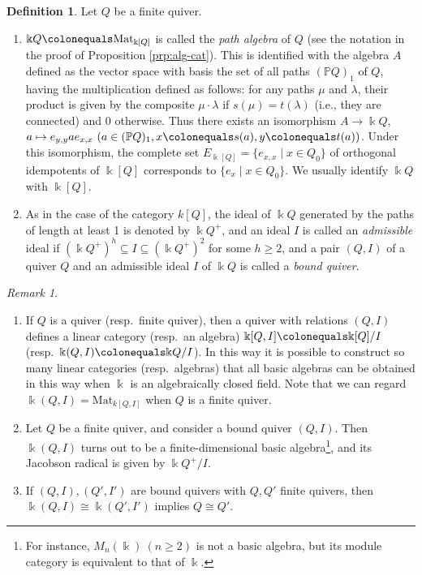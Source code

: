 \documentclass{surv-l}
\numberwithin{equation}{chapter}
\numberwithin{figure}{chapter}
\theoremstyle{plain}
\theoremstyle{definition}
\newtheorem{dfn}[thm]{Definition}
\theoremstyle{remark}
\newtheorem{rmk}[thm]{Remark}
\begin{document}
\begin{dfn}
Let $Q$ be a finite quiver.
\begin{enumerate}
\item
$\Bbbk Q\colonequals  \mathrm{Mat}_{\Bbbk[Q]}$ is called the \emph{path algebra} of $Q$
(see the notation in the proof of Proposition \ref{prp:alg-cat}).
This is identified with the algebra $A$ defined as the vector space
with basis the set of all paths $(\mathbb{P} Q)_1$ of $Q$, having the
multiplication defined as follows:
for any paths $\mu$ and $\lambda$, their product is given by
the composite $\mu\cdot\lambda$ if $s(\mu)=t(\lambda)$ (i.e., they are connected)
and 0 otherwise.
Thus there exists an isomorphism
$A \to \Bbbk Q$,\ $a \mapsto e_{y,y}ae_{x,x}\ (a \in (\mathbb{P} Q)_1, x\colonequals s(a), y\colonequals t(a))$.
Under this isomorphism, the complete set $E_{\Bbbk[Q]} = \{e_{x,x} \mid x \in Q_0\}$
of orthogonal idempotents of $\Bbbk[Q]$ corresponds to
$\{e_x \mid x \in Q_0\}$.
We usually identify $\Bbbk Q$ with $\Bbbk[Q]$.
\item
As in the case of the category $k[Q]$, the ideal of $\Bbbk Q$ generated by
the paths of length at least 1 is denoted by $\Bbbk Q^{+}$, and an ideal
$I$ is called an \emph{admissible} ideal if
$(\Bbbk Q^+)^{h} \subseteq I \subseteq (\Bbbk Q^+)^{2}$
for some $h \ge 2$, and a pair
$(Q,I)$ of a quiver $Q$ and an admissible ideal $I$ of $\Bbbk Q$
is called a \emph{bound quiver}.
\end{enumerate}
\end{dfn}

\begin{rmk}\leavevmode
\label{rmk:bound-qvr}\begin{enumerate}
\item If $Q$ is a quiver (resp.\ finite quiver),
then a quiver with relations $(Q, I)$ defines a linear category (resp.\ an algebra)
$\Bbbk[Q,I]\colonequals \Bbbk[Q]/I$ (resp.\ $\Bbbk(Q,I)\colonequals \Bbbk Q/I$).
In this way it is possible to construct so many linear categories (resp.\ algebras)
that all basic algebras can be obtained in this way
when $\Bbbk$ is an algebraically closed field.
Note that we can regard $\Bbbk(Q, I) = \mathrm{Mat}_{k[Q,I]}$ when
$Q$ is a finite quiver.

\item Let $Q$ be a finite quiver, and consider a bound quiver $(Q, I)$.
Then $\Bbbk(Q, I)$ turns out to be a finite-dimensional basic algebra\footnote{For instance, $M_n(\Bbbk)\ (n \ge 2)$ is not a basic algebra, but
its module category is equivalent to that of $\Bbbk$.
}, and its Jacobson radical is given by $\Bbbk Q^+/I$.

\item If $(Q, I), (Q', I')$ are bound quivers with $Q, Q'$ finite quivers,
then
$\Bbbk(Q, I)\! \cong \Bbbk(Q', I')$ implies $Q \cong Q'$.
\end{enumerate}
\end{rmk}
\end{document}
